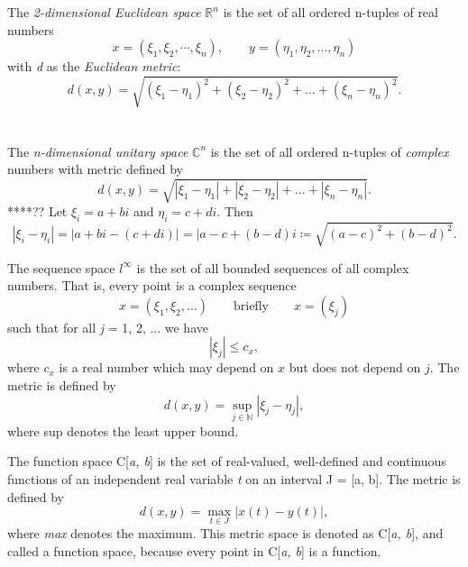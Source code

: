 \documentclass[11pt]{article}
\newcommand{\ex}[0]{\tcbhighmath[boxrule=0.5mm, colframe=pink, colback=pink, arc=10mm, size=fbox]{Ex:}}
\begin{document}
\vspace{1em}
\noindent
\ex{}
The \textit{2-dimensional Euclidean space} $\mathbb{R}^n$ is the set of all ordered n-tuples of real numbers
\[ x = (\xi_1,\xi_2, \cdots,\xi_n), \quad\quad y = (\eta_1, \eta_2,..., \eta_n) \]
with \textit{d} as the \textit{Euclidean metric}:
\[ d(x,y) = \sqrt{(\xi_1 - \eta_1)^2 +(\xi_2 - \eta_2)^2 + ... + (\xi_n - \eta_n)^2}. \]
\\\\
The \textit{n-dimensional unitary space} $\mathbb{C}^n$ is the set of all ordered n-tuples of \textit{complex} numbers with metric defined by
$$ d(x,y) = \sqrt{|\xi_1 - \eta_1| +|\xi_2 - \eta_2| + ... + |\xi_n - \eta_n|}. $$
****?? Let $\xi_i = a + b\textit{i}$ and $\eta_i = c + d\textit{i}$. Then $$|\xi_i - \eta_i| = |a + b\textit{i} - (c + d\textit{i})| = |a - c + (b - d)\textit{i} \coloneq \sqrt{(a - c)^2 + (b - d)^2}. $$

\vspace{1em}
\noindent
{}
The sequence space $l^\infty$ is the set of all bounded sequences of all complex numbers. That is, every point is a complex sequence
$$ x = (\xi_1, \xi_2,...) \quad\quad \mathrm{briefly } \quad\quad x = (\xi_j)$$
such that for all \textit{j} = 1, 2, ... we have $$|\xi_j| \leq c_x,$$ where $c_x$ is a real number which may depend on $x$ but does not depend on $j$. The metric is defined by $$d(x, y) = \sup\limits_{j \in \mathbb{N}}|\xi_j - \eta_j|,$$
where sup denotes the least upper bound.

\vspace{1em}
\noindent
{}
The function space C[\textit{a, b}] is the set of real-valued, well-defined and continuous functions of an independent real variable \textit{t} on an interval J = [a, b]. The metric is defined by
$$d(x, y) = \max\limits_{t \in J}|x(t) - y(t)|,$$
where \textit{max} denotes the maximum. This metric space is denoted as C[\textit{a, b}], and called a function space, because every point in C[\textit{a, b}] is a function.
\end{document}
